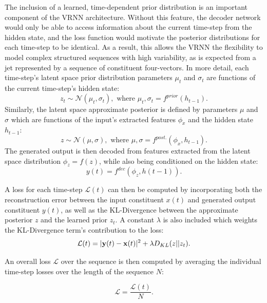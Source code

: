 \documentclass[12pt, a4paper]{article}
\begin{document}
The inclusion of a learned, time-dependent prior distribution is an important component of the VRNN architecture. Without this feature, the decoder network would only be able to access information about the current time-step from the hidden state, and the loss function would motivate the posterior distributions for each time-step to be identical. As a result, this allows the VRNN the flexibility to model complex structured sequences with high variability, as is expected from a jet represented by a sequence of constituent four-vectors.
In more detail, each time-step's latent space prior distribution parameters $\mu_{t}$ and $\sigma_{t}$ are functions of the current time-step's hidden state:
\begin{equation}
	z_{t} \sim \mathcal{N}(\mu_{t}, \sigma_{t}), \text{ where } \mu_{t}, \sigma_{t} = f^{prior}(h_{t-1}).
\end{equation} 
Similarly, the latent space approximate posterior is defined by parameters $\mu$ and $\sigma$ which are functions of the input's extracted features $\phi_{x}$ and the hidden state $h_{t-1}$:
\begin{equation}
	z \sim \mathcal{N}(\mu, \sigma), \text{ where } \mu, \sigma = f^{post.}(\phi_{x}, h_{t-1}).
\end{equation} 
The generated output is then decoded from features extracted from the latent space distribution $\phi_{z} = f(z)$, while also being conditioned on the hidden state:
\begin{equation}
y(t) = f^{dec}(\phi_{z}, h(t-1)).
\end{equation} 

A loss for each time-step $\mathcal{L}(t)$ can then be computed by incorporating both the reconstruction error between the input constituent $x(t)$ and generated output constituent $y(t)$, as well as the KL-Divergence between the approximate posterior $z$ and the learned prior $z_{t}$. A constant $\lambda$ is also included which weights the KL-Divergence term's contribution to the loss:
\begin{equation}
\mathcal{L}(t) = |{\bf y}(t) - {\bf x}(t)|^{2} + \lambda D_{KL}(z||z_{t}).
\end{equation} 

An overall loss $\mathcal{L}$ over the sequence is then computed by averaging the individual time-step losses over the length of the sequence $N$:

\begin{equation}
\mathcal{L} = \frac{\mathcal{L}(t)}{N}.
\end{equation} 
\end{document}
